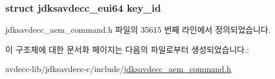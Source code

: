 \subsubsection[{\texorpdfstring{key\+\_\+id}{key_id}}]{\setlength{\rightskip}{0pt plus 5cm}struct {\bf jdksavdecc\+\_\+eui64} key\+\_\+id}\hypertarget{structjdksavdecc__aem__command__auth__delete__key_a37cbdf6056556ccfaee3ab01dc7c3032}{}\label{structjdksavdecc__aem__command__auth__delete__key_a37cbdf6056556ccfaee3ab01dc7c3032}


jdksavdecc\+\_\+aem\+\_\+command.\+h 파일의 35615 번째 라인에서 정의되었습니다.



이 구조체에 대한 문서화 페이지는 다음의 파일로부터 생성되었습니다.\+:\begin{DoxyCompactItemize}
\item 
avdecc-\/lib/jdksavdecc-\/c/include/\hyperlink{jdksavdecc__aem__command_8h}{jdksavdecc\+\_\+aem\+\_\+command.\+h}\end{DoxyCompactItemize}
